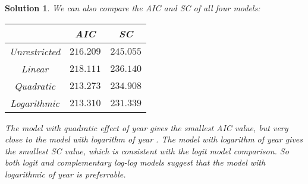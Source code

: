 \documentclass[11pt]{article}
\newtheorem{sol}{Solution}
\begin{document}
\begin{sol}
	We can also compare the AIC and SC of all four models:
	\begin{center}
	\begin{tabular}{ccc}
		\hline
		& AIC & SC\\
		\hline
		Unrestricted&$216.209$& $245.055$\\
		Linear&$218.111$& $236.140$\\
		Quadratic& $213.273$ & $234.908$\\
		Logarithmic& $213.310$ & $231.339$\\
		\hline
	\end{tabular}
	\end{center}
	The model with quadratic effect of year gives the smallest AIC value, but very close to the model with logarithm of year . The model with logarithm of year gives the smallest SC value, which is consistent with the logit model comparison.\vskip 2mm
	So both logit and complementary log-log models suggest that the model with logarithmic of year is preferrable.
\end{sol}
\end{document}
